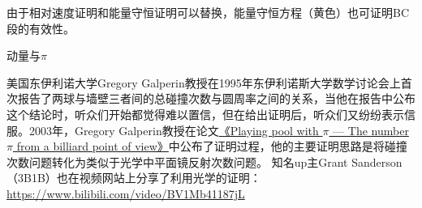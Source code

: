 \begin{problemset}
	由于相对速度证明和能量守恒证明可以替换，能量守恒方程（黄色）也可证明BC段的有效性。
	\newpage
	\item 动量与$\pi$
	
	美国东伊利诺大学Gregory Galperin教授在1995年东伊利诺斯大学数学讨论会上首次报告了两球与墙壁三者间的总碰撞次数与圆周率之间的关系，当他在报告中公布这个结论时，听众们开始都觉得难以置信，但在给出证明后，听众们又纷纷表示信服。2003年，Gregory Galperin教授在论文\href{https://github.com/Campanulata/LectureNotesOnHighSchoolPhysics/blob/master/data/PLAYING%20POOL%20WITH%20%CF%80.pdf}{《Playing pool with $\pi$ — The number $\pi$ from a billiard point of view》}中公布了证明过程，他的主要证明思路是将碰撞次数问题转化为类似于光学中平面镜反射次数问题。
	知名up主Grant Sanderson（3B1B）也在视频网站上分享了利用光学的证明：\href{https://www.bilibili.com/video/BV1Mb41187jL}{https://www.bilibili.com/video/BV1Mb41187jL}


\end{problemset}
